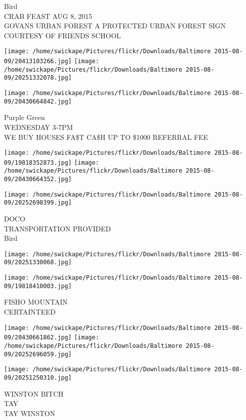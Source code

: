 \documentclass[10pt,letterpaper]{article}
\begin{document}
Bird\\
CRAB FEAST AUG 8, 2015\\
GOVANS URBAN FOREST A PROTECTED URBAN FOREST SIGN COURTESY OF FRIENDS SCHOOL
\pagebreak

\texttt{[image: /home/swickape/Pictures/flickr/Downloads/Baltimore 2015-08-09/20413103266.jpg]}
\texttt{[image: /home/swickape/Pictures/flickr/Downloads/Baltimore 2015-08-09/20251332078.jpg]}

\vspace{0.25in}
\texttt{[image: /home/swickape/Pictures/flickr/Downloads/Baltimore 2015-08-09/20430664842.jpg]}

Purple Green\\
WEDNESDAY 3{-}7PM\\
WE BUY HOUSES FA\$T CA\$H UP TO \$1000 REFERRAL FEE
\pagebreak

\texttt{[image: /home/swickape/Pictures/flickr/Downloads/Baltimore 2015-08-09/19818352873.jpg]}
\texttt{[image: /home/swickape/Pictures/flickr/Downloads/Baltimore 2015-08-09/20430664352.jpg]}

\vspace{0.25in}
\texttt{[image: /home/swickape/Pictures/flickr/Downloads/Baltimore 2015-08-09/20252698399.jpg]}

DOCO\\
TRANSPORTATION PROVIDED\\
Bird
\pagebreak

\texttt{[image: /home/swickape/Pictures/flickr/Downloads/Baltimore 2015-08-09/20251330068.jpg]}

\vspace{0.25in}
\texttt{[image: /home/swickape/Pictures/flickr/Downloads/Baltimore 2015-08-09/19818410003.jpg]}

FISHO MOUNTAIN\\
CERTAINTEED
\pagebreak

\texttt{[image: /home/swickape/Pictures/flickr/Downloads/Baltimore 2015-08-09/20430661862.jpg]}
\texttt{[image: /home/swickape/Pictures/flickr/Downloads/Baltimore 2015-08-09/20252696059.jpg]}

\texttt{[image: /home/swickape/Pictures/flickr/Downloads/Baltimore 2015-08-09/20251250310.jpg]}

WINSTON BITCH\\
TAY\\
TAY WINSTON
\pagebreak
\end{document}

